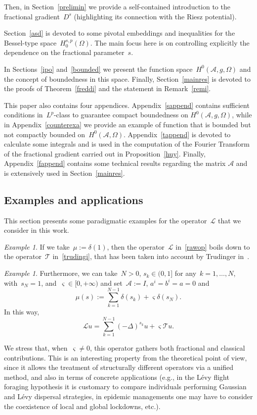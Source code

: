 \documentclass[11pt,hyp,]{nyjm}
\numberwithin{equation}{section}
\theoremstyle{remark}
\newtheorem{example}[theorem]{Example}
\begin{document}
Then, in Section~\ref{prelimin} we provide a self-contained introduction to the fractional gradient~$D^s $ (highlighting its connection
with the Riesz potential).

Section~\ref{asd} is devoted to some pivotal embeddings and inequalities for the Bessel-type space~$H^{s,p}_0(\Omega)$. The main focus here is on controlling
explicitly the dependence on the fractional parameter~$s$.

In Sections~\ref{ipo} and~\ref{bounded} we present the function space~$H^0(\mathcal{A},g,\Omega)$ and the concept of boundedness in this space. Finally, Section~\ref{mainres} is devoted to the proofs of Theorem~\ref{freddi} and the statement in Remark~\ref{remi}.

This paper also contains four appendices.  Appendix~\ref{sappend} contains sufficient conditions in~$L^p$-class to guarantee compact boundedness on $H^0(\mathcal{A},g,\Omega)$, while in Appendix~\ref{counterexa} we provide an example of function
that is bounded  but not compactly bounded on~$H^0(\mathcal{A},\Omega)$.
Appendix~\ref{tappend} is devoted to calculate some integrals and is used in the computation of the Fourier Transform of the fractional gradient carried out in Proposition~\ref{huy}. Finally, Appendix~\ref{fappend} contains some technical results regarding the matrix $\mathcal{A}$ and is extensively used in Section~\ref{mainres}.

\subsection{Examples and applications}\label{application}

This section presents some paradigmatic examples for the operator~$\mathcal{L}$ that we consider in this work.

\begin{example}
{I}f we take~$\mu:= \delta(1)$, then the operator~$\mathcal{L}$ in~\eqref{rawop}
boils down to the operator~$\mathcal{T}$ in~\eqref{trudingi}, that has been taken into account by Trudinger in~\cite{trudinger}. \end{example}

\begin{example}
Furthermore, we can take~$N>0$, $s_k \in (0,1]$ for any~$k=1, \ldots, N$, with~$s_N=1$, and~$\varsigma\in[0,+\infty)$
and set~$\mathcal{A}:=I$, $a^i=b^i=a=0$ and 
\[ \mu(s) := \sum_{k=1}^{N-1} \delta(s_k) + \varsigma \delta(s_N).\]
In this way,
\[ \mathcal{L}u= \sum_{k=1}^{N-1} (- \Delta)^{s_k}u + \varsigma \mathcal{T}u. \]

We stress that, when~$\varsigma\ne0$, this operator gathers both fractional and classical contributions.
This is an interesting property from the theoretical point of view, since it allows the treatment of structurally different operators via a unified method, and also in terms of concrete applications
(e.g., in the L\'evy flight foraging hypothesis it is customary to compare individuals
performing Gaussian and L\'evy dispersal strategies, in epidemic managements one may have to consider the coexistence of local and global lockdowns, etc.).\end{example}
\end{document}
